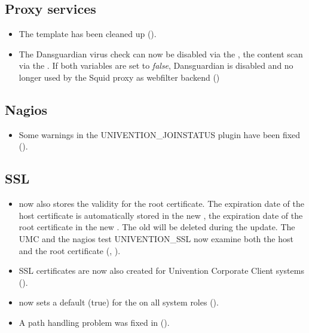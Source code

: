 \subsection{Proxy services}
\begin{itemize}
\item The  template has been cleaned up ().

\item The Dansguardian virus check can now be disabled via the
  , the content scan via the
  . If both variables are set to
  \emph{false}, Dansguardian is disabled and no longer used by the
  Squid proxy as webfilter backend ()
\end{itemize}


\subsection{Nagios}
\begin{itemize}
\item Some warnings in the UNIVENTION\_JOINSTATUS plugin have been
  fixed ().
\end{itemize}


\subsection{SSL}
\begin{itemize}
\item {} now also stores the validity for the root
certificate. The expiration date of the host certificate is
automatically stored in the new , the
expiration date of the root certificate in the new
. The old  will be
deleted during the update. The UMC and the nagios test UNIVENTION\_SSL
now examine both the host and the root certificate (,
).

\item SSL certificates are now also created for Univention Corporate
  Client systems ().

\item {} now sets a default (true) for the
  on all system roles ().

\item A path handling problem was fixed in 
  ().
\end{itemize}

